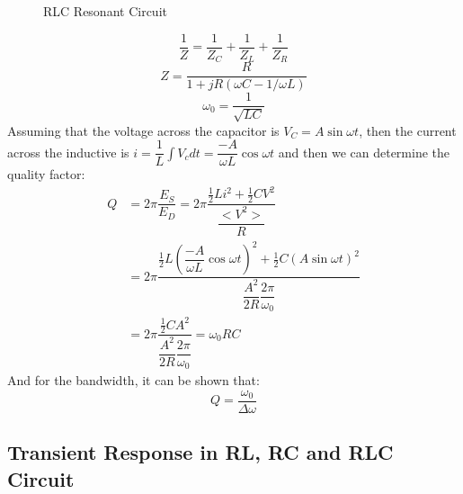 \documentclass[UTF8]{article}
\begin{document}
\begin{itemize}
\begin{figure}[htbp]
\begin{center}
    \caption{RLC Resonant Circuit}
  \end{center}
\end{figure}
$$\dfrac{1}{Z}=\dfrac{1}{Z_C}+\dfrac{1}{Z_L}+\dfrac{1}{Z_R}$$
$$Z=\dfrac{R}{1+jR(\omega C-1/\omega L)}$$
$$\omega _0=\dfrac{1}{\sqrt{LC}}$$
 {Assuming that the voltage across the capacitor is $V_C=A\sin \omega t$, then the current across the inductive is $i=\dfrac{1}{L}\int V_cdt=\dfrac{-A}{\omega L}\cos \omega t$ and then we can determine the quality factor:}
\begin{align*}
Q&=2\pi \dfrac{E_S}{E_D}=2\pi \dfrac{\frac{1}{2}Li^2+\frac{1}{2}CV^2}{\dfrac{<V^2>}{R}}\\
&=2\pi \dfrac{\frac{1}{2}L(\dfrac{-A}{\omega L}\cos \omega t)^2+\frac{1}{2}C(A\sin \omega t)^2}{\dfrac{A^2}{2R}\dfrac{2\pi}{\omega _0}}\\
&=2\pi \dfrac{\frac{1}{2}CA^2}{\dfrac{A^2}{2R}\dfrac{2\pi}{\omega _0}}=\omega _0 RC
\end{align*}
 {And for the bandwidth, it can be shown that: }
$$Q=\dfrac{\omega _0}{\Delta\omega }$$
\end{itemize}

\subsection{Transient Response in RL, RC and RLC Circuit}
\end{document}
